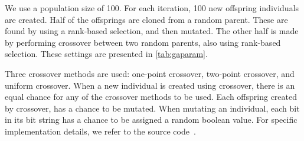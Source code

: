We use a population size of 100. For each iteration, 100 new offspring individuals are created. Half of the offsprings are cloned from a random parent. These are found by using a rank-based selection, and then mutated. The other half is made by performing crossover between two random parents, also using rank-based selection. These settings are presented in \cref{tab:gaparam}.

Three crossover methods are used: one-point crossover, two-point crossover, and uniform crossover. When a new individual is created using crossover, there is an equal chance for any of the crossover methods to be used. Each offspring created by crossover, has a  chance to be mutated. When mutating an individual, each bit in its bit string has a  chance to be assigned a random boolean value. For specific implementation details, we refer to the source code~\cite{mbm:kmc:ekoGA}.






